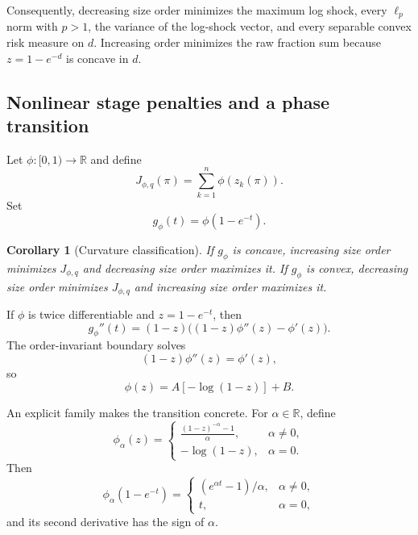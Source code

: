 \documentclass[pdflatex,iicol,sn-basic]{sn-jnl}
\theoremstyle{thmstyleone}
\newtheorem{corollary}[theorem]{Corollary}
\theoremstyle{thmstyletwo}
\theoremstyle{thmstylethree}
\newcommand{\R}{\mathbb{R}}
\begin{document}
Consequently, decreasing size order minimizes the maximum log shock, every
\(\ell_p\) norm with \(p>1\), the variance of the log-shock vector, and every
separable convex risk measure on \(d\). Increasing order minimizes the raw
fraction sum because \(z=1-e^{-d}\) is concave in \(d\).

\subsection{Nonlinear stage penalties and a phase transition}

Let \(\phi:[0,1)\to\R\) and define
\begin{equation}\label{eq:nonlinear}
J_{\phi,q}(\pi)=\sum_{k=1}^n\phi(z_k(\pi)).
\end{equation}
Set
\[
g_\phi(t)=\phi(1-e^{-t}).
\]

\begin{corollary}[Curvature classification]
\label{cor:curvature}
If \(g_\phi\) is concave, increasing size order minimizes \(J_{\phi,q}\) and
decreasing size order maximizes it. If \(g_\phi\) is convex, decreasing size
order minimizes \(J_{\phi,q}\) and increasing size order maximizes it.
\end{corollary}

If \(\phi\) is twice differentiable and \(z=1-e^{-t}\), then
\begin{equation}\label{eq:curvature}
g_\phi''(t)
=(1-z)\bigl((1-z)\phi''(z)-\phi'(z)\bigr).
\end{equation}
The order-invariant boundary solves
\[
(1-z)\phi''(z)=\phi'(z),
\]
so
\begin{equation}\label{eq:boundary}
\phi(z)=A[-\log(1-z)]+B.
\end{equation}

An explicit family makes the transition concrete. For \(\alpha\in\R\), define
\begin{equation}\label{eq:alpha}
\phi_\alpha(z)=
\begin{cases}
\displaystyle\frac{(1-z)^{-\alpha}-1}{\alpha},&\alpha\ne0,\\[6pt]
-\log(1-z),&\alpha=0.
\end{cases}
\end{equation}
Then
\[
\phi_\alpha(1-e^{-t})=
\begin{cases}
(e^{\alpha t}-1)/\alpha,&\alpha\ne0,\\
t,&\alpha=0,
\end{cases}
\]
and its second derivative has the sign of \(\alpha\).
\end{document}
